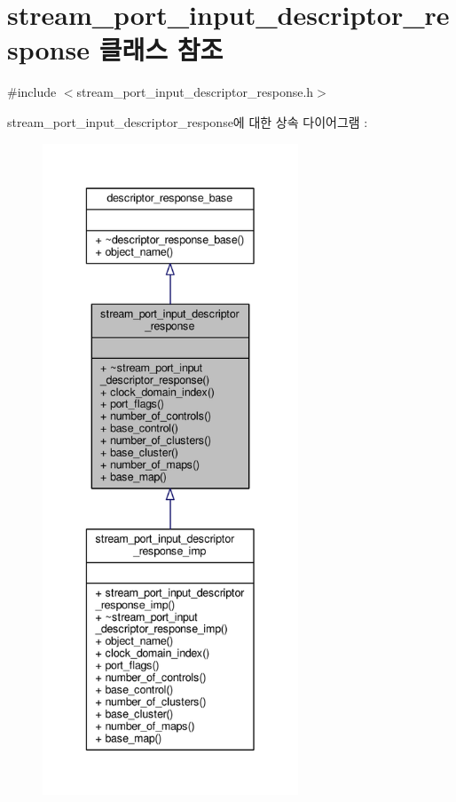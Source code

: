 \hypertarget{classavdecc__lib_1_1stream__port__input__descriptor__response}{}\section{stream\+\_\+port\+\_\+input\+\_\+descriptor\+\_\+response 클래스 참조}
\label{classavdecc__lib_1_1stream__port__input__descriptor__response}


{\ttfamily \#include $<$stream\+\_\+port\+\_\+input\+\_\+descriptor\+\_\+response.\+h$>$}



stream\+\_\+port\+\_\+input\+\_\+descriptor\+\_\+response에 대한 상속 다이어그램 \+: 
\nopagebreak
\begin{figure}[H]
\begin{center}
\leavevmode
\includegraphics[height=550pt]{classavdecc__lib_1_1stream__port__input__descriptor__response__inherit__graph}
\end{center}
\end{figure}


